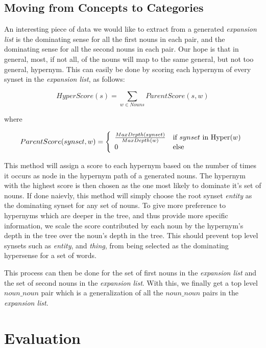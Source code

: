 \documentclass[11pt]{article}
\begin{document}
\subsection{Moving from Concepts to Categories}

An interesting piece of data we would like to extract from a generated
\emph{expansion list} is the dominating sense for all the first nouns in each
pair, and the dominating sense for all the second nouns in each pair.  Our hope
is that in general, most, if not all, of the nouns will map to the same general, but
not too general, hypernym.  This can easily be done by scoring each hypernym of
every synset in the \emph{expansion list}, as follows:

\small
\[ HyperScore(s) = \displaystyle\sum_{w \in Nouns} ParentScore(s, w) 
\]

\normalsize
where

\small
\[ ParentScore(synset, w) = \left\{ 
 \begin{array}{l l}
   {\frac {MaxDepth(synset)} {MaxDepth(w)}} & \mbox{if $synset$ in Hyper($w$)}\\
   0 & \mbox{else}\\
 \end{array} \right.
\]

\normalsize
This method will assign a score to each hypernym based on the number of times it
occurs as node in the hypernym path of a generated nouns.  The hypernym with the
highest score is then chosen as the one most likely to dominate it's set of nouns.
If done naievly, this method will simply choose the root synset \emph{entity} as
the dominating synset for any set of nouns.  To give more preference
to hypernyms which are deeper in the tree, and thus provide more specific
information, we scale the score contributed by each noun by the hypernym's
depth in the tree over the noun's depth in the tree.  This should prevent top
level synsets such as \emph{entity}, and \emph{thing}, from being selected as 
the dominating hypersense for a set of words.  

This process can then be done for the set of first nouns in the \emph{expansion
list} and the set of second nouns in the \emph{expansion list}.  With this, we
finally get a top level $noun\_noun$ pair which is a generalization of all the
$noun\_noun$ pairs in the \emph{expansion list}.

\section{Evaluation}
\label{sec:evaluation}
\end{document}
